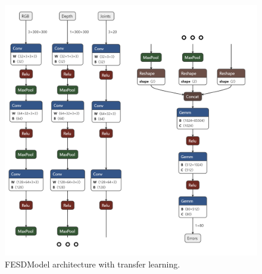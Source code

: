 \begin{figure}[h]
  \centering
  \includegraphics[width=\linewidth]{figures/Model/FESD.png}
  \caption[FESDModel architecture version 2]{FESDModel architecture with transfer learning.}
  \label{fig:model_architecture_v1}
\end{figure}





